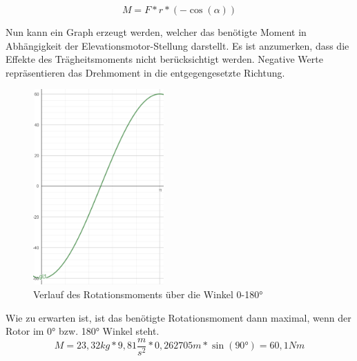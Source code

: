 \begin{equation}
	M=F*r*(-\cos(\alpha))
\end{equation}

Nun kann ein Graph erzeugt werden, welcher das benötigte Moment in Abhängigkeit der Elevationsmotor-Stellung darstellt. Es ist anzumerken, dass die Effekte des Trägheitsmoments nicht berücksichtigt werden. Negative Werte repräsentieren das Drehmoment in die entgegengesetzte Richtung.

\begin{figure}[h!]
	\centering
	\includegraphics[width=5cm]{../ref/Rotationsmoment Elevation.png}
	\caption{Verlauf des Rotationsmoments über die Winkel 0-180°}
	\label{fig:verlauf-trägheitsmoment}
\end{figure}

Wie zu erwarten ist, ist das benötigte Rotationsmoment dann maximal, wenn der Rotor im 0° bzw. 180° Winkel steht. 
\begin{equation}
	M=23,32kg*9,81\frac{m}{s^2}*0,262705m*\sin(90°)=60,1Nm
\end{equation}

